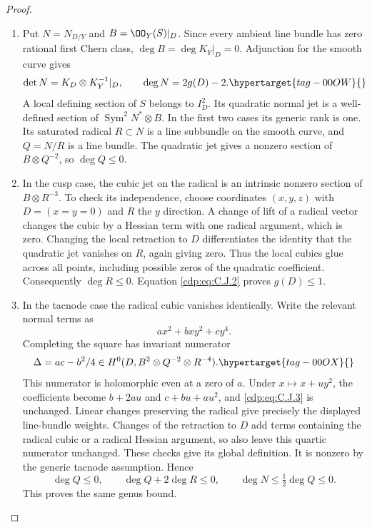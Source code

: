 \begin{proof}

\begin{enumerate}[label={$\langle1\rangle$\arabic*.},leftmargin=*]
\item Put $N=N_{D/Y}$ and $B=\OO_Y(S)|_D$. Since every ambient line bundle has zero rational first Chern class, $\deg B=\deg K_Y|_D=0$. Adjunction for the smooth curve gives
\begin{equation}
 \det N=K_D\otimes K_Y^{-1}|_D,\qquad
 \deg N=2g(D)-2.                                      \hypertarget{tag-00OW}{}\label{cdp:eq:C.J.2}
\end{equation}
A local defining section of $S$ belongs to $I_D^2$. Its quadratic normal jet is a well-defined section of $\operatorname{Sym}^2N^*\otimes B$. In the first two cases its generic rank is one. Its saturated radical $R\subset N$ is a line subbundle on the smooth curve, and $Q=N/R$ is a line bundle. The quadratic jet gives a nonzero section of $B\otimes Q^{-2}$, so
$\deg Q\le0$.

\item In the cusp case, the cubic jet on the radical is an intrinsic nonzero section of $B\otimes R^{-3}$. To check its independence, choose coordinates $(x,y,z)$ with $D=(x=y=0)$ and $R$ the $y$ direction. A change of lift of a radical vector changes the cubic by a Hessian term with one radical argument, which is zero. Changing the local retraction to $D$ differentiates the identity that the quadratic jet vanishes on $R$, again giving zero. Thus the local cubics glue across all points, including possible zeros of the quadratic coefficient. Consequently $\deg R\le0$. Equation \eqref{cdp:eq:C.J.2} proves $g(D)\le1$.

\item In the tacnode case the radical cubic vanishes identically. Write the relevant normal terms as
\[
 a x^2+bxy^2+cy^4.
\]
Completing the square has invariant numerator
\begin{equation}
 \Delta=ac-b^2/4\in
 H^0(D,B^2\otimes Q^{-2}\otimes R^{-4}).               \hypertarget{tag-00OX}{}\label{cdp:eq:C.J.3}
\end{equation}
This numerator is holomorphic even at a zero of $a$. Under $x\mapsto x+uy^2$, the coefficients become $b+2au$ and $c+bu+au^2$, and \eqref{cdp:eq:C.J.3} is unchanged. Linear changes preserving the radical give precisely the displayed line-bundle weights. Changes of the retraction to $D$ add terms containing the radical cubic or a radical Hessian argument, so also leave this quartic numerator unchanged. These checks give its global definition. It is nonzero by the generic tacnode assumption. Hence
\[
 \deg Q\le0,\qquad \deg Q+2\deg R\le0,
 \qquad \deg N\le\tfrac12\deg Q\le0.
\]
This proves the same genus bound.


\end{enumerate}
\end{proof}

